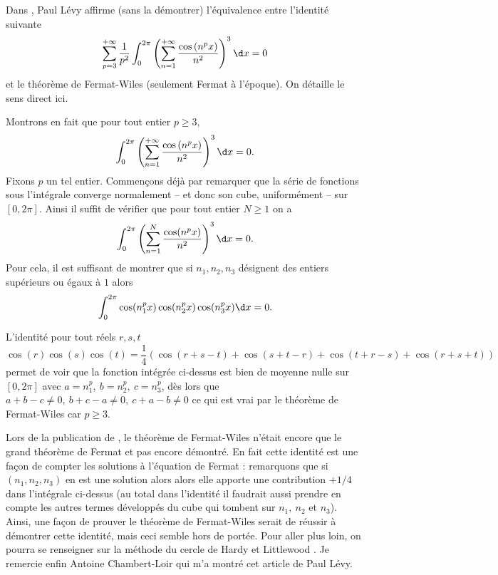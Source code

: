 \documentclass{notes}
\begin{document}

Dans \cite{Levy}, Paul Lévy affirme (sans la démontrer) l'équivalence entre l'identité suivante
\[ \sum_{p=3}^{+\infty} \frac{1}{p^{2}} \int_{0}^{2\pi} \left( \sum_{n=1}^{+\infty} \frac{\cos\left( n^{p }x \right)}{n^{2}} \right)^{3}  \d x = 0  \]
et le théorème de Fermat-Wiles (seulement Fermat à l'époque). On détaille le sens direct ici.

Montrons en fait que pour tout entier $p\geq 3$, 
\[ \int_{0}^{2\pi} \left( \sum_{n=1}^{+\infty} \frac{\cos\left( n^{p }x \right)}{n^{2}} \right)^{3}  \d x = 0 .  \]
Fixons $p$ un tel entier. Commençons déjà par remarquer que la série de fonctions sous l'intégrale converge normalement -- et donc son cube, uniformément -- sur $[0,2\pi]$. Ainsi il suffit de vérifier que pour tout entier $N\geq 1$ on a 
\[  \int_{0}^{2\pi}   \left( \sum_{n=1}^{N} \frac{\cos(n^{p}x)}{n^{2}} \right)^{3} \d x = 0. \]
Pour cela, il est suffisant de montrer que si $n_1,n_2,n_3$ désignent des entiers supérieurs ou égaux à $1$ alors 
\[ \int_{0}^{2\pi} \cos(n_1^{p} x)\cos(n_2^{p}x) \cos(n_3^{p}x) \d x = 0.\]

L'identité pour tout réels $r,s,t$ 
\[\cos \left( r \right) \cos \left( s \right) \cos \left( t \right) = \frac 14 \left( \cos(r+s-t)+\cos(s+t-r) + \cos(t+r-s) + \cos(r+s+t) \right)\]
permet de voir que la fonction intégrée ci-dessus est bien de moyenne nulle sur $[0,2\pi]$ avec $a=n_1^{p},\ b=n_2^{p},\ c=n_3^{p}$, dès lors que $a+b-c \neq 0,\ b+c-a \neq 0,\ c+a-b \neq 0$ ce qui est vrai par le théorème de Fermat-Wiles car $p \geq 3$.  


\begin{rem}
  Lors de la publication de \cite{Levy}, le théorème de Fermat-Wiles n'était encore que le grand théorème de Fermat et pas encore démontré. En fait cette identité est une façon de compter les solutions à l'équation de Fermat : remarquons que si $(n_1,n_2,n_3)$ en est une solution alors alors elle apporte une contribution $+1/4$ dans l'intégrale ci-dessus (au total dans l'identité il faudrait aussi prendre en compte les autres termes développés du cube qui tombent sur $n_1,\ n_2$ et $n_3$).  Ainsi, une façon de prouver le théorème de Fermat-Wiles serait de réussir à démontrer cette identité, mais ceci semble hors de portée. Pour aller plus loin, on pourra se renseigner sur la méthode du cercle de Hardy et Littlewood \cite{HW}.   Je remercie enfin Antoine Chambert-Loir qui m'a montré cet article de Paul Lévy.
\end{rem}





 
\end{document}
